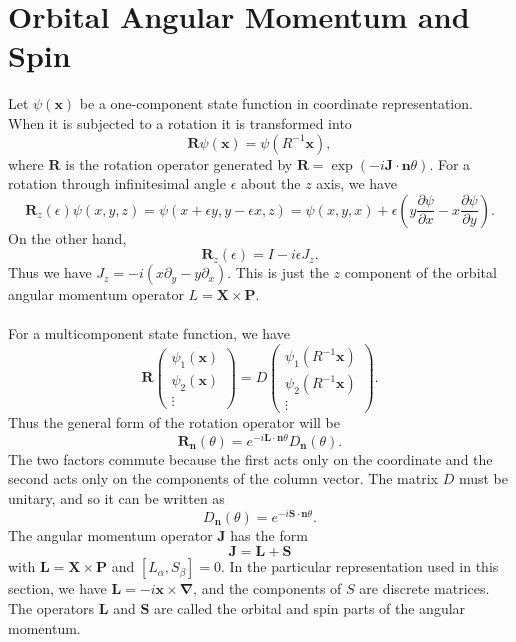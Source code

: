 \section{Orbital Angular Momentum and Spin}
Let $\psi(\bm{x})$ be a one-component state function in coordinate representation. When it is subjected to a rotation it is transformed into
\[\bm{R}\psi(\bm{x}) = \psi(R^{-1}\bm{x}),\]
where $\bm{R}$ is the rotation operator generated by $\bm{R} = \exp(-i\bm{J}\cdot\bm{n}\theta)$. For a rotation through infinitesimal angle $\epsilon$ about the $z$ axis, we have
\[\bm{R}_z(\epsilon) \psi(x,y,z) = \psi(x+\epsilon y,y-\epsilon x,z) = \psi(x,y,x) + \epsilon (y \frac{\partial \psi}{\partial x} - x \frac{\partial \psi}{\partial y}).\]
On the other hand, 
\[\bm{R}_z(\epsilon) = I - i\epsilon J_z.\]
Thus we have $J_z = -i(x \partial_{y} - y \partial_{x})$.
This is just the $z$ component of the orbital angular momentum operator $L = \bm{X} \times \bm{P}$.
\\ \\
For a multicomponent state function, we have
\[\bm{R} \left( \begin{matrix} \psi_1(\bm{x}) \\ \psi_2(\bm{x}) \\  \vdots \end{matrix} \right) = D \left( \begin{matrix} \psi_1(R^{-1}\bm{x}) \\ \psi_2(R^{-1}\bm{x}) \\  \vdots \end{matrix} \right).\]
Thus the general form of the rotation operator will be
\[\bm{R}_{\bm{n}}(\theta) = e^{-i\bm{L}\cdot\bm{n}\theta}D_{\bm{n}}(\theta).\]
The two factors commute because the first acts only on the coordinate and the second acts only on the components of the column vector. The matrix $D$ must be unitary, and so it can be written as
\[D_{\bm{n}}(\theta) = e^{-i\bm{S}\cdot\bm{n}\theta}.\]
The angular momentum operator $\bm{J}$ has the form
\[\bm{J} = \bm{L} + \bm{S}\]
with $\bm{L} = \bm{X} \times \bm{P}$ and $[L_{\alpha},S_{\beta}] = 0$. In the particular representation used in this section, we have $\bm{L} = -i\bm{x}\times\bm{\nabla}$, and the components of $S$ are
discrete matrices. The operators $\bm{L}$ and $\bm{S}$ are called the orbital and spin parts of the angular momentum.

